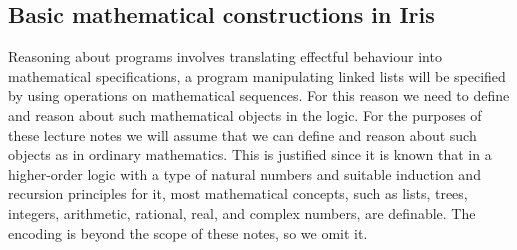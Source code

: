 \subsection{Basic mathematical constructions in Iris}
\label{sec:basic-constructions-in-iris}

Reasoning about programs involves translating effectful behaviour into mathematical specifications, \eg{} a program manipulating linked lists will be specified by using operations on mathematical sequences.
For this reason we need to define and reason about such mathematical objects in the logic.
For the purposes of these lecture notes we will assume that we can define and reason about such objects as in ordinary mathematics.
This is justified since it is known that in a higher-order logic with a type of natural numbers and suitable induction and recursion principles for it, most mathematical concepts, such as lists, trees, integers, arithmetic, rational, real, and complex numbers, are definable.
The encoding is beyond the scope of these notes, so we omit it.

